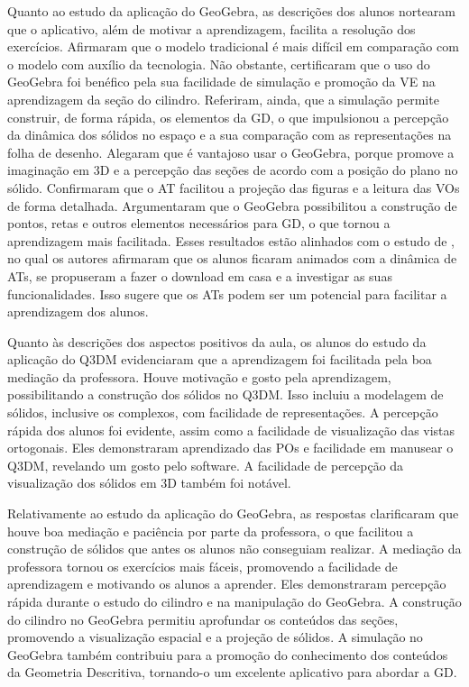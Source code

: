 Quanto ao estudo da aplicação do GeoGebra, as descrições dos alunos
nortearam que o aplicativo, além de motivar a aprendizagem, facilita a
resolução dos exercícios. Afirmaram que o modelo tradicional é mais
difícil em comparação com o modelo com auxílio da tecnologia. Não
obstante, certificaram que o uso do GeoGebra foi benéfico pela sua
facilidade de simulação e promoção da VE na aprendizagem da seção do
cilindro. Referiram, ainda, que a simulação permite construir, de forma
rápida, os elementos da GD, o que impulsionou a percepção da dinâmica
dos sólidos no espaço e a sua comparação com as representações na folha
de desenho. Alegaram que é vantajoso usar o GeoGebra, porque promove a
imaginação em 3D e a percepção das seções de acordo com a posição do
plano no sólido. Confirmaram que o AT facilitou a projeção das figuras e
a leitura das VOs de forma detalhada. Argumentaram que o GeoGebra
possibilitou a construção de pontos, retas e outros elementos
necessários para GD, o que tornou a aprendizagem mais facilitada. Esses
resultados estão alinhados com o estudo de \textcite{silva2017}, no
qual os autores afirmaram que os alunos ficaram animados com a dinâmica
de ATs, se propuseram a fazer o download em casa e a investigar as suas
funcionalidades. Isso sugere que os ATs podem ser um potencial para
facilitar a aprendizagem dos alunos.

Quanto às descrições dos aspectos positivos da aula, os alunos do estudo
da aplicação do Q3DM evidenciaram que a aprendizagem foi facilitada pela
boa mediação da professora. Houve motivação e gosto pela aprendizagem,
possibilitando a construção dos sólidos no Q3DM. Isso incluiu a
modelagem de sólidos, inclusive os complexos, com facilidade de
representações. A percepção rápida dos alunos foi evidente, assim como a
facilidade de visualização das vistas ortogonais. Eles demonstraram
aprendizado das POs e facilidade em manusear o Q3DM, revelando um gosto
pelo software. A facilidade de percepção da visualização dos sólidos em
3D também foi notável.

Relativamente ao estudo da aplicação do GeoGebra, as respostas
clarificaram que houve boa mediação e paciência por parte da professora,
o que facilitou a construção de sólidos que antes os alunos não
conseguiam realizar. A mediação da professora tornou os exercícios mais
fáceis, promovendo a facilidade de aprendizagem e motivando os alunos a
aprender. Eles demonstraram percepção rápida durante o estudo do
cilindro e na manipulação do GeoGebra. A construção do cilindro no
GeoGebra permitiu aprofundar os conteúdos das seções, promovendo a
visualização espacial e a projeção de sólidos. A simulação no GeoGebra
também contribuiu para a promoção do conhecimento dos conteúdos da
Geometria Descritiva, tornando-o um excelente aplicativo para abordar a
GD.

